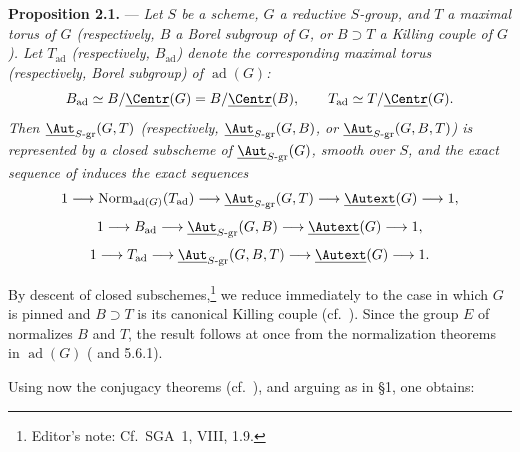 \medskip\noindent\textbf{Proposition 2.1.} ---
{\itshape Let \(S\) be a scheme, \(G\) a reductive \(S\)-group, and
\(T\) a maximal torus of \(G\) (respectively, \(B\) a Borel subgroup
of \(G\), or \(B\supset T\) a Killing couple of \(G\)). Let
\(T_{\mathrm{ad}}\) (respectively, \(B_{\mathrm{ad}}\)) denote the
corresponding maximal torus (respectively, Borel subgroup) of
\(\operatorname{ad}(G)\):
\[
  B_{\mathrm{ad}}
  \simeq B/\underline{\Centr}(G)
  =B/\underline{\Centr}(B),
  \qquad
  T_{\mathrm{ad}}\simeq T/\underline{\Centr}(G).
\]
Then
\(\underline{\Aut}_{S\text{-}\mathrm{gr}}(G,T)\)
(respectively,
\(\underline{\Aut}_{S\text{-}\mathrm{gr}}(G,B)\), or
\(\underline{\Aut}_{S\text{-}\mathrm{gr}}(G,B,T)\))
is represented by a closed subscheme of
\(\underline{\Aut}_{S\text{-}\mathrm{gr}}(G)\), smooth over \(S\),
and the exact sequence of  induces the exact sequences
\[
  1\longrightarrow
  \operatorname{Norm}_{\operatorname{ad}(G)}(T_{\mathrm{ad}})
  \longrightarrow
  \underline{\Aut}_{S\text{-}\mathrm{gr}}(G,T)
  \longrightarrow
  \underline{\Autext}(G)
  \longrightarrow1,
\]
\[
  1\longrightarrow B_{\mathrm{ad}}
  \longrightarrow
  \underline{\Aut}_{S\text{-}\mathrm{gr}}(G,B)
  \longrightarrow
  \underline{\Autext}(G)
  \longrightarrow1,
\]
\[
  1\longrightarrow T_{\mathrm{ad}}
  \longrightarrow
  \underline{\Aut}_{S\text{-}\mathrm{gr}}(G,B,T)
  \longrightarrow
  \underline{\Autext}(G)
  \longrightarrow1.
\]}

By descent of closed subschemes,\footnote{Editor's note: Cf.\ SGA~1,
VIII, 1.9.} we reduce immediately to the case in which \(G\) is
pinned and \(B\supset T\) is its canonical Killing couple
(cf.\ ). Since the group \(E\) of  normalizes
\(B\) and \(T\), the result follows at once from the normalization
theorems in \(\operatorname{ad}(G)\) ( and 5.6.1).


Using now the conjugacy theorems (cf.\ ), and arguing
as in \S1, one obtains:

